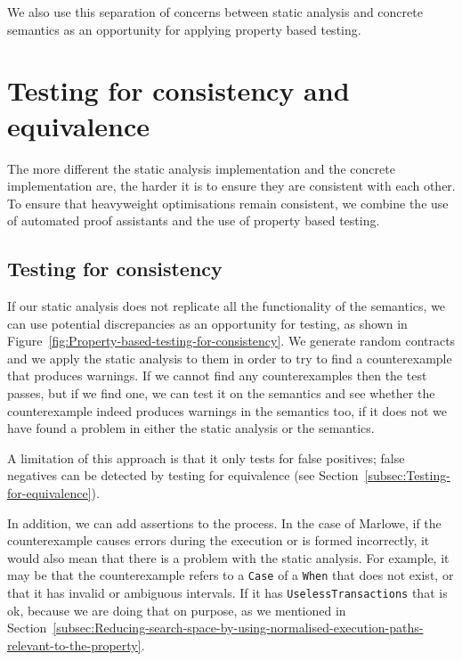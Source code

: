 \documentclass[english,runningheads]{llncs}
\begin{document}
We also use this separation of concerns between static analysis and
concrete semantics as an opportunity for applying
property based testing.%

\section{Testing for consistency and equivalence\label{sec:Testing}}

The more different the static analysis implementation and the concrete
implementation are, the harder it is to ensure they are consistent with
each other. To ensure that heavyweight optimisations remain consistent,
we combine the use of automated proof assistants and the use of property based testing.

\subsection{Testing for consistency\label{subsec:Testing-for-consistency} }

If our static analysis does not replicate all the functionality of
the semantics, we can use potential discrepancies as an opportunity
for testing, as shown in Figure~\ref{fig:Property-based-testing-for-consistency}.
We generate random contracts and we apply the static analysis to them
in order to try to find a counterexample that produces warnings. If
we cannot find any counterexamples then the test passes, but if we
find one, we can test it on the semantics and see whether the counterexample
indeed produces warnings in the semantics too, if it does not we have
found a problem in either the static analysis or the semantics.

A limitation of this approach is that it only tests for false positives; 
false negatives can be detected by testing
for equivalence (see Section~\ref{subsec:Testing-for-equivalence}).

In addition, we can add assertions to the process. In the case of
Marlowe, if the counterexample causes errors during the execution or is
formed incorrectly, it would also mean that there is a problem with
the static analysis. For example, it may be that the counterexample
refers to a \texttt{Case} of a \texttt{When} that does not exist,
or that it has invalid or ambiguous intervals. If it has \texttt{UselessTransactions}
that is ok, because we are doing that on purpose, as we mentioned in Section~\ref{subsec:Reducing-search-space-by-using-normalised-execution-paths-relevant-to-the-property}.
\end{document}
